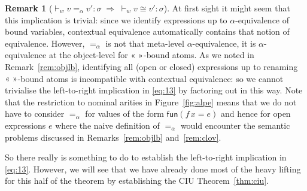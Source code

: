 \documentclass{LMCS}
\theoremstyle{plain}
\theoremstyle{definition}
\newtheorem{remark}[thm]{Remark}
\newcommand{\aeq}{=_{\alpha}}
\newcommand{\ar}[1][\sigma]{#1}
\newcommand{\BINDVAL}[2]{\mathopen{\text{\normalfont\guillemotleft}}#1
  \mathclose{\text{\normalfont\guillemotright}}#2}
\newcommand{\ent}{\vdash}
\newcommand{\EQ}{\mathbin{\kw{=}}}
\renewcommand{\exp}[1][e]{#1}
\newcommand{\FUN}{\kw{fun}}
\newcommand{\imp}{\Rightarrow}
\newcommand{\kw}[1]{\mathsf{#1}}
\newcommand{\ofty}{:}
\newcommand{\opeq}{\cong}
\newcommand{\val}[1][v]{#1}
\newcommand{\vid}[1][x]{#1}
\newcommand{\w}[1][w]{#1}
\begin{document}
\begin{remark}[${}\ent_{\w} \val\aeq\val'\ofty \ar \;\imp\; {}\ent_{\w} \val
  \opeq\val'\ofty\ar$]
  At first sight it might seem that this implication is trivial: since
  we identify expressions up to $\alpha$-equivalence of bound
  variables, contextual equivalence automatically contains that notion
  of equivalence. However, $\aeq$ is not that meta-level
  $\alpha$-equivalence, it is $\alpha$-equivalence at the object-level
  for $\BINDVAL{\ }{}$-bound atoms. As we noted in
  Remark~\ref{rem:objlb}, identifying all (open or closed) expressions
  up to renaming $\BINDVAL{\ }{}$-bound atoms is incompatible with
  contextual equivalence: so we cannot trivialise the left-to-right
  implication in \eqref{eq:13} by factoring out in this way. Note that
  the restriction to nominal arities in Figure~\ref{fig:alpe} means
  that we do not have to consider $\aeq$ for values of the form
  $\FUN(\vid[f]\,\vid\EQ \exp)$ and hence for open expressions $\exp$
  where the naive definition of $\aeq$ would encounter the semantic
  problems discussed in Remarks~\ref{rem:objlb} and~\ref{rem:clov}.
  
  So there really is something to do to establish the left-to-right
  implication in \eqref{eq:13}. However, we will see that we have
  already done most of the heavy lifting for this half of the theorem
  by establishing the CIU Theorem~\ref{thm:ciu}.
\end{remark}
\end{document}

